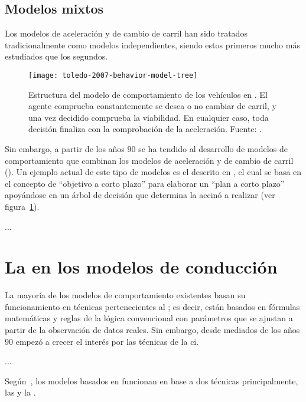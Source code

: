 \subsection{Modelos mixtos}

Los modelos de aceleración y de cambio de carril han sido tratados tradicionalmente como modelos independientes, siendo estos primeros mucho más estudiados que los segundos.

\begin{figure}
	\texttt{[image: toledo-2007-behavior-model-tree]}
	\caption{Estructura del modelo de comportamiento de los vehículos en \cite{Toledo2007}. El agente comprueba constantemente se desea o no cambiar de carril, y una vez decidido comprueba la viabilidad. En cualquier caso, toda decisión finaliza con la comprobación de la aceleración. Fuente: \cite{Toledo2007}.}
	\label{fig:toledo-2007-behavior-model-tree}
\end{figure}

Sin embargo, a partir de los años $90$ se ha tendido al desarrollo de modelos de comportamiento que combinan los modelos de aceleración y de cambio de carril (\cite{Ma2004}). Un ejemplo actual de este tipo de modelos es el descrito en \cite{Toledo2007}, el cual se basa en el concepto de \enquote{objetivo a corto plazo} para elaborar un \enquote{plan a corto plazo} apoyándose en un árbol de decisión que determina la accinó a realizar (ver figura~\ref{fig:toledo-2007-behavior-model-tree}).

...

\section{La  en los modelos de conducción}

La mayoría de los modelos de comportamiento existentes basan su funcionamiento en técnicas pertenecientes al ; es decir, están basados en fórmulas matemáticas y reglas de la lógica convencional con parámetros que se ajustan a partir de la observación de datos reales. Sin embargo, desde mediados de los años $90$ empezó a crecer el interés por las técnicas de la \gls{ci}.

...



Según~\cite{Aghabayk2015}, los modelos basados en  funcionan en base a dos técnicas principalmente, las  y la .


